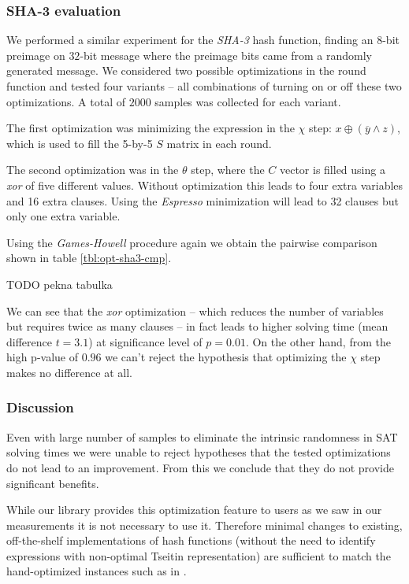 \subsubsection{SHA-3 evaluation} 
We performed a similar experiment for the \emph{SHA-3} hash function, finding an $8$-bit preimage on $32$-bit message where the preimage bits came from a randomly generated message.
We considered two possible optimizations in the round function and tested four variants -- all combinations of turning on or off these two optimizations.
A total of $2000$ samples was collected for each variant.

The first optimization was minimizing the expression in the $\chi$ step: $x \oplus (\overline{y} \land z)$, which is used to fill the 5-by-5 $S$ matrix in each round.

The second optimization was in the $\theta$ step, where the $C$ vector is filled using a \emph{xor} of five different values.
Without optimization this leads to four extra variables and 16 extra clauses.
Using the \emph{Espresso} minimization will lead to 32 clauses but only one extra variable.

Using the \emph{Games-Howell} procedure again we obtain the pairwise comparison shown in table \ref{tbl:opt-sha3-cmp}.

TODO pekna tabulka

We can see that the \emph{xor} optimization -- which reduces the number of variables but requires twice as many clauses -- in fact leads to higher solving time (mean difference $t=3.1$) at significance level of $p=0.01$.
On the other hand, from the high p-value of $0.96$ we can't reject the hypothesis that optimizing the $\chi$ step makes no difference at all.

%

\subsubsection{Discussion}
Even with large number of samples to eliminate the intrinsic randomness in SAT solving times we were unable to reject hypotheses that the tested optimizations do not lead to an improvement.
From this we conclude that they do not provide significant benefits.

While our library provides this optimization feature to users as we saw in our measurements it is not necessary to use it.
Therefore minimal changes to existing, off-the-shelf implementations of hash functions (without the need to identify expressions with non-optimal Tseitin representation) are sufficient to match the hand-optimized instances such as in \cite{nossum2012sat}.

